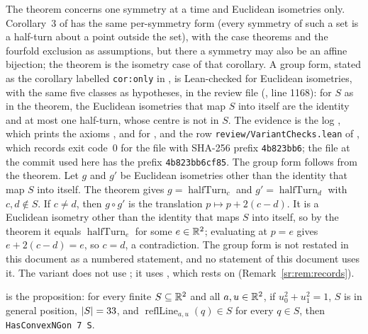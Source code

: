 \begin{remark}\label{sr:rem:variant}
The theorem concerns one symmetry at a time and Euclidean isometries only. Corollary~3 of
 has the same per-symmetry form (every symmetry of such a set is a half-turn about a point
outside the set), with the case theorems and the fourfold exclusion as assumptions, but there a symmetry may also be
an affine bijection; the theorem is the isometry case of that corollary. A group form, stated as the corollary labelled
\texttt{cor:only} in , is Lean-checked for Euclidean isometries, with the same five
classes as hypotheses, in the review file  (,
line 1168): for $S$ as in the theorem, the Euclidean isometries that map $S$ into itself are the identity and at most
one half-turn, whose centre is not in $S$. The evidence is the log , which prints
the axioms ,  and  for , and the
row \texttt{review/VariantChecks.lean} of , which records exit code~$0$ for the file with
SHA-256 prefix \texttt{4b823bb6}; the file at the commit used here has the prefix \texttt{4b823bb6cf85}. The group form
follows from the theorem. Let $g$ and $g'$ be Euclidean isometries other than the identity that map $S$ into itself.
The theorem gives $g=\operatorname{halfTurn}_c$ and $g'=\operatorname{halfTurn}_d$ with $c,d\notin S$. If $c\ne d$,
then $g\circ g'$ is the translation $p\mapsto p+2(c-d)$. It is a Euclidean isometry other than the identity that maps
$S$ into itself, so by the theorem it equals $\operatorname{halfTurn}_e$ for some $e\in\mathbb R^2$; evaluating at $p=e$ gives
$e+2(c-d)=e$, so $c=d$, a contradiction. The group form is not restated in this document as a numbered statement, and
no statement of this document uses it. The variant does not use ; it uses , which
rests on  (Remark~\ref{sr:rem:records}).
\end{remark}

\begin{definition}\label{sr:def:exclusion-line}
 is the proposition: for every finite $S\subseteq\mathbb R^2$ and all $a,u\in\mathbb R^2$, if
$u_0^2+u_1^2=1$, $S$ is in general position, $\lvert S\rvert=33$, and $\operatorname{reflLine}_{a,u}(q)\in S$ for every $q\in
S$, then \texttt{HasConvexNGon 7 S}.
\end{definition}

